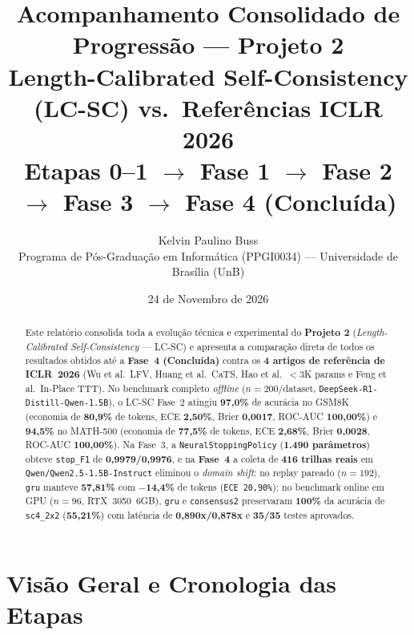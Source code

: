 \documentclass[11pt,a4paper]{article}
\title{
  \vspace{-1.0cm}
  \textcolor{unbblue}{\textbf{Acompanhamento Consolidado de Progressão --- Projeto 2}}\\
  \large Length-Calibrated Self-Consistency (LC-SC) vs.\ Referências ICLR 2026\\
  \normalsize \textcolor{mutedgray}{Etapas 0--1 $\rightarrow$ Fase 1 $\rightarrow$ Fase 2 $\rightarrow$ Fase 3 $\rightarrow$ Fase 4 (Concluída)}
}
\author{
  Kelvin Paulino Buss \\
  \small Programa de Pós-Graduação em Informática (PPGI0034) --- Universidade de Brasília (UnB)
}
\date{24 de Novembro de 2026}
\begin{document}
\maketitle
\thispagestyle{fancy}

\begin{abstract}
Este relatório consolida toda a evolução técnica e experimental do \textbf{Projeto 2} (\emph{Length-Calibrated Self-Consistency} --- LC-SC) e apresenta a comparação direta de todos os resultados obtidos até a \textbf{Fase~4 (Concluída)} contra os \textbf{4 artigos de referência de ICLR~2026} (Wu et al.\ LFV, Huang et al.\ CaTS, Hao et al.\ $<3$K params e Feng et al.\ In-Place TTT). No benchmark completo \emph{offline} ($n=200$/dataset, \texttt{DeepSeek-R1-Distill-Qwen-1.5B}), o LC-SC Fase~2 atingiu \textbf{97,0\%} de acurácia no GSM8K (economia de \textbf{80,9\%} de tokens, ECE \textbf{2,50\%}, Brier \textbf{0,0017}, ROC-AUC \textbf{100,00\%}) e \textbf{94,5\%} no MATH-500 (economia de \textbf{77,5\%} de tokens, ECE \textbf{2,68\%}, Brier \textbf{0,0028}, ROC-AUC \textbf{100,00\%}). Na Fase~3, a \texttt{NeuralStoppingPolicy} (\textbf{1.490 parâmetros}) obteve \texttt{stop\_F1} de \textbf{0,9979/0,9976}, e na \textbf{Fase~4} a coleta de \textbf{416 trilhas reais} em \texttt{Qwen/Qwen2.5-1.5B-Instruct} eliminou o \emph{domain shift}: no replay pareado ($n=192$), \texttt{gru} manteve \textbf{57,81\%} com \textbf{$-$14,4\%} de tokens (\texttt{ECE 20,90\%}); no benchmark online em GPU ($n=96$, RTX~3050~6GB), \texttt{gru} e \texttt{consensus2} preservaram \textbf{100\%} da acurácia de \texttt{sc4\_2x2} (\textbf{55,21\%}) com latência de \textbf{0,890x/0,878x} e \textbf{35/35} testes aprovados.
\end{abstract}

\section{Visão Geral e Cronologia das Etapas}
\end{document}
